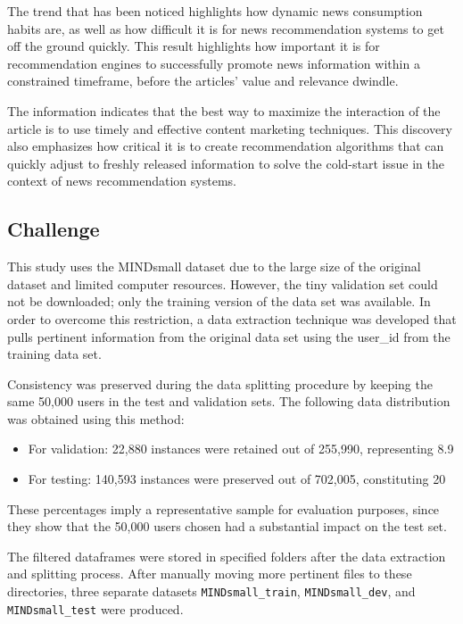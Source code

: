 \documentclass[9pt,twocolumn,twoside,lineno]{gsajnl}
\begin{document}
The trend that has been noticed highlights how dynamic news consumption habits are, as well as how difficult it is for news recommendation systems to get off the ground quickly. This result highlights how important it is for recommendation engines to successfully promote news information within a constrained timeframe, before the articles' value and relevance dwindle.

The information indicates that the best way to maximize the interaction of the article is to use timely and effective content marketing techniques. This discovery also emphasizes how critical it is to create recommendation algorithms that can quickly adjust to freshly released information to solve the cold-start issue in the context of news recommendation systems.

\subsection{Challenge}
This study uses the MINDsmall dataset due to the large size of the original dataset and limited computer resources. However, the tiny validation set could not be downloaded; only the training version of the data set was available. In order to overcome this restriction, a data extraction technique was developed that pulls pertinent information from the original data set using the user\_id from the training data set.

Consistency was preserved during the data splitting procedure by keeping the same 50,000 users in the test and validation sets. The following data distribution was obtained using this method:

\begin{itemize}[noitemsep]
\item For validation: 22,880 instances were retained out of 255,990, representing 8.9%
\item For testing: 140,593 instances were preserved out of 702,005, constituting 20%
\end{itemize}

These percentages imply a representative sample for evaluation purposes, since they show that the 50,000 users chosen had a substantial impact on the test set.

The filtered dataframes were stored in specified folders after the data extraction and splitting process. After manually moving more pertinent files to these directories, three separate datasets \texttt{MINDsmall\_train}, \texttt{MINDsmall\_dev}, and \texttt{MINDsmall\_test} were produced.
\end{document}
